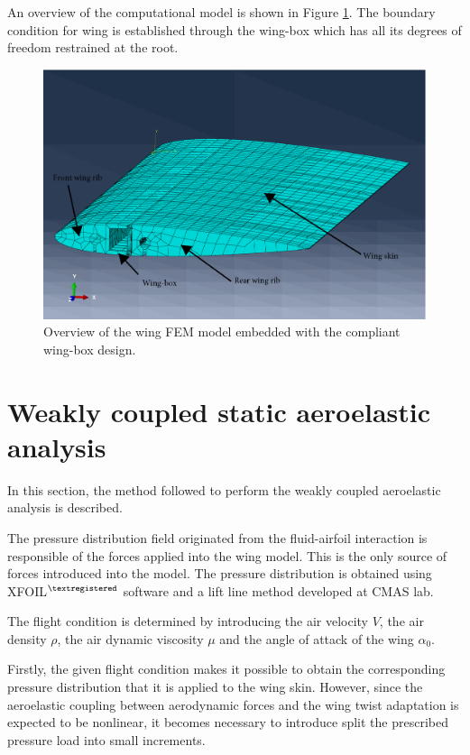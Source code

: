     An overview of the computational model is shown in Figure \ref{fig:wing}. The boundary condition for wing is established through the wing-box which has all its degrees of freedom restrained at the root.

    \begin{figure}[!htpb]
      \centering
      \includegraphics[width=0.7 \textwidth]{figures/wing-model/wing_correct}
      \caption[Overview of the wing FEM model embedded with the compliant wing-box design]{Overview of the wing FEM model embedded with the compliant wing-box design.}
      \label{fig:wing}
    \end{figure}

  \clearpage
  \section{Weakly coupled static aeroelastic analysis} \label{sec:aeroelastic_aeroelastic}

    In this section, the method followed to perform the weakly coupled aeroelastic analysis is described. 

    The pressure distribution field originated from the fluid-airfoil interaction is responsible of the forces applied into the wing model. This is the only source of forces introduced into the model. The pressure distribution is obtained using XFOIL$^{\textregistered}$ software and a lift line method developed at CMAS lab.

    The flight condition is determined by introducing the air velocity $V$, the air density $\rho$, the air dynamic viscosity $\mu$ and the angle of attack of the wing $\alpha_0$.

    Firstly, the given flight condition makes it possible to obtain the corresponding pressure distribution that it is applied to the wing skin. However, since the aeroelastic coupling between aerodynamic forces and the wing twist adaptation is expected to be nonlinear, it becomes necessary to introduce split the prescribed pressure load into small increments.

